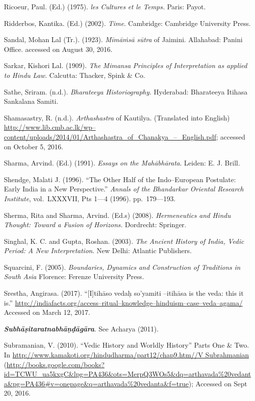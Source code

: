 \begin{thebibliography}{99}
  Ricoeur, Paul. (Ed.) (1975). \textit{les Cultures et le Temps.} Paris: Payot.

  Ridderbos, Kantika. (Ed.) (2002). \textit{Time}. Cambridge: Cambridge University Press.

  Sandal, Mohan Lal (Tr.). (1923). \textit{Mīmāṁsā sūtra} of Jaimini. Allahabad: Panini Office. accessed on August 30, 2016.

  Sarkar, Kishori Lal. (1909). \textit{The Mimansa Principles of Interpretation as applied to Hindu Law.} Calcutta: Thacker, Spink \& Co. 

  Sathe, Sriram. (n.d.). \textit{Bharateeya Historiography.} Hyderabad: Bharateeya Itihasa Sankalana Samiti.

  Shamasastry, R. (n.d.). \textit{Arthashastra} of Kautilya. (Translated into English) \url{http://www.lib.cmb.ac.lk/wp–content/uploads/2014/01/Arthashastra_of_Chanakya_–_English.pdf}; accessed on October 5, 2016.

  Sharma, Arvind. (Ed.) (1991). \textit{Essays on the Mahābhārata}. Leiden: E. J. Brill.

  Shendge, Malati J. (1996). “The Other Half of the Indo–European Postulate: Early India in a New Perspective.” \textit{Annals of the Bhandarkar Oriental Research Institute}, vol.~LXXXVII, Pts 1––4 (1996). pp.~179––193.

  Sherma, Rita and Sharma, Arvind. (Ed.s) (2008). \textit{Hermeneutics and Hindu Thought: Toward a Fusion of Horizons.} Dordrecht: Springer.

  Singhal, K. C. and Gupta, Roshan. (2003). \textit{The Ancient History of India, Vedic Period: A New Interpretation}. New Delhi: Atlantic Publishers.

  Squarcini, F. (2005). \textit{Boundaries, Dynamics and Construction of Traditions in South Asia} Florence: Ferenze University Press.

  Srestha, Angirasa. (2017). “[I]tihāso vedaḥ so’yamiti –itihāsa is the veda: this it is.” \url{http://indiafacts.org/access–ritual–knowledge–hinduism–case–veda–agama/} Accessed on March 12, 2017.

  \textbf{\textit{Subhāṣitaratnabhāṇḍāgāra}}. See Acharya (2011).

  Subramanian, V. (2010). “Vedic History and Worldly History” Parts One \& Two. In \url{http://www.kamakoti.org/hindudharma/part12/chap9.htm//V Subrahmanian} (\url{http://books.google.com/books?id=TCWU_ua5kxgC&lpg=PA436&ots=MerpQ3WOs5&dq=arthavada%20vedanta&pg=PA436#v=onepage&q=arthavada%20vedanta&f=true}); Accessed on Sept 20, 2016.


\end{thebibliography}
